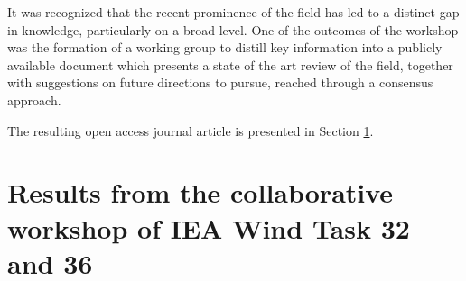 It was recognized that the recent prominence of the field has led to a distinct gap in knowledge, particularly on a broad level. One of the outcomes of the workshop was the formation of a working group to distill key information into a publicly available document which presents a state of the art review of the field, together with suggestions on future directions to pursue, reached through a consensus approach.

The resulting open access journal article is presented in Section \ref{sec:IEA_paper}.


\clearpage
\section{Results from the collaborative workshop of IEA Wind Task 32 and 36}
\label{sec:IEA_paper}
